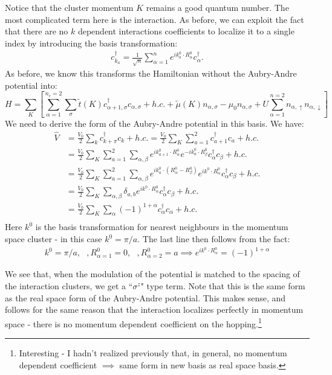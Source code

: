 \documentclass[12pt]{article}
\numberwithin{equation}{section}
\begin{document}
Notice that the cluster momentum $K$ remains a good quantum number. The most complicated term here is the interaction. As before, we can exploit the fact that there are no $k$ dependent interactions coefficients to localize it to a single index by introducing the basis transformation:
\begin{align}
    c^\dagger_{k_a}=\frac{1}{\sqrt{n}}\sum_{\alpha=1}^{n}e^{ik^0_a\cdot R^{0}_{\alpha}}c^\dagger_{\alpha} .
\end{align}
As before, we know this transforms the Hamiltonian without the Aubry-Andre potential into:
\begin{equation}
    H=\sum_{K}
    \left[\sum_{\alpha=1}^{n_c=2}\sum_{\sigma}
    \tilde t(K) c^\dagger_{\alpha+1,\sigma}c_{\alpha,\sigma}+h.c.
    +\tilde\mu(K) n_{\alpha,\sigma}-\mu_0n_{\alpha,\sigma}
    +U\sum_{\alpha=1}^{n=2}n_{\alpha,\uparrow}n_{\alpha,\downarrow}
    \right]
\end{equation}
We need to derive the form of the Aubry-Andre potential in this basis. We have:
\begin{align}
    \hat{V}&=\frac{V_0}{2}\sum_{k}c^\dagger_{k+\pi}c_k+h.c.
    =\frac{V_0}{2}\sum_{K}\sum_{a=1}^{2}c^\dagger_{a+1}c_{a}+h.c.\\
    &=\frac{V_0}{2}\sum_{K}\sum_{a=1}^{2}\sum_{\alpha,\beta}
    e^{ik^0_{a+1}\cdot R^0_{\alpha}}
    e^{-ik^0_{a}\cdot R^0_{\beta}}
    c^\dagger_{\alpha}c_{\beta}+h.c.\\
    &=\frac{V_0}{2}\sum_{K}\sum_{a=1}^{2}\sum_{\alpha,\beta}
    e^{ik_a^0\cdot (R^0_{\alpha}-R^0_{\beta})}e^{ik^0\cdot R^0_{\alpha}}c^\dagger_{\alpha}c_{\beta}+h.c.\\
    &=\frac{V_0}{2}\sum_{K}\sum_{\alpha,\beta}\delta_{a,b}
    e^{ik^0\cdot R^0_{\alpha}}c^\dagger_{\alpha}c_{\beta}+h.c.\\
    &=\frac{V_0}{2}\sum_{K}\sum_{\alpha}(-1)^{1+\alpha}
    c^\dagger_{\alpha}c_{\alpha}+h.c.\\
\end{align}
Here $k^0$ is the basis transformation for nearest neighbours in the momentum space cluster - in this case $k^0=\pi/a$. The last line then follows from the fact:
\begin{align}
    k^0=\pi/a,\text{  },R^0_{\alpha=1}=0, \text{  },R^0_{\alpha=2}=a
    \implies e^{ik^0\cdot R^0_{\alpha}}=(-1)^{1+\alpha}
\end{align}

We see that, when the modulation of the potential is matched to the spacing of the interaction clusters, we get a ``$\sigma^z$" type term. Note that this is the same form as the real space form of the Aubry-Andre potential. This makes sense, and follows for the same reason that the interaction localizes perfectly in momentum space - there is no momentum dependent coefficient on the hopping.\footnote{Interesting - I hadn't realized previously that, in general, no momentum dependent coefficient $\implies$ same form in new basis as real space basis.}
\end{document}

